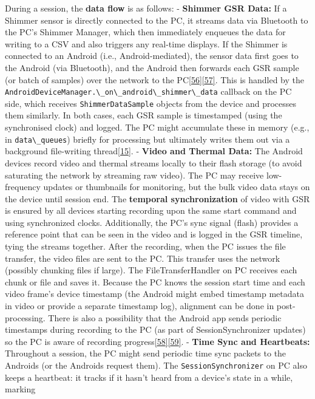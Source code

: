 \documentclass[12pt,a4paper]{article}
\begin{document}
During a session, the \textbf{data flow} is as follows: - \textbf{Shimmer GSR Data:} If a Shimmer sensor is directly connected to the PC, it streams data via Bluetooth to the PC's Shimmer Manager, which then immediately enqueues the data for writing to a CSV and also triggers any real-time displays. If the Shimmer is connected to an Android (i.e., Android-mediated), the sensor data first goes to the Android (via Bluetooth), and the Android then forwards each GSR sample (or batch of samples) over the network to the PC\href{https://github.com/buccancs/bucika_gsr/blob/7048f7f6a7536f5cd577ed2184800d3dad97fd08/PythonApp/shimmer_manager.py\#L260-L269}{{[}56{]}}\href{https://github.com/buccancs/bucika_gsr/blob/7048f7f6a7536f5cd577ed2184800d3dad97fd08/PythonApp/shimmer_manager.py\#L261-L268}{{[}57{]}}. This is handled by the \passthrough{\lstinline!AndroidDeviceManager.\_on\_android\_shimmer\_data!} callback on the PC side, which receives \passthrough{\lstinline!ShimmerDataSample!} objects from the device and processes them similarly. In both cases, each GSR sample is timestamped (using the synchronised clock) and logged. The PC might accumulate these in memory (e.g., in \passthrough{\lstinline!data\_queues!}) briefly for processing but ultimately writes them out via a background file-writing thread\href{https://github.com/buccancs/bucika_gsr/blob/7048f7f6a7536f5cd577ed2184800d3dad97fd08/PythonApp/shimmer_manager.py\#L163-L171}{{[}15{]}}. - \textbf{Video and Thermal Data:} The Android devices record video and thermal streams locally to their flash storage (to avoid saturating the network by streaming raw video). The PC may receive low-frequency updates or thumbnails for monitoring, but the bulk video data stays on the device until session end. The \textbf{temporal synchronization} of video with GSR is ensured by all devices starting recording upon the same start command and using synchronized clocks. Additionally, the PC's sync signal (flash) provides a reference point that can be seen in the video and is logged in the GSR timeline, tying the streams together. After the recording, when the PC issues the file transfer, the video files are sent to the PC. This transfer uses the network (possibly chunking files if large). The FileTransferHandler on PC receives each chunk or file and saves it. Because the PC knows the session start time and each video frame's device timestamp (the Android might embed timestamp metadata in video or provide a separate timestamp log), alignment can be done in post-processing. There is also a possibility that the Android app sends periodic timestamps during recording to the PC (as part of SessionSynchronizer updates) so the PC is aware of recording progress\href{https://github.com/buccancs/bucika_gsr/blob/7048f7f6a7536f5cd577ed2184800d3dad97fd08/PythonApp/session/session_synchronizer.py\#L113-L122}{{[}58{]}}\href{https://github.com/buccancs/bucika_gsr/blob/7048f7f6a7536f5cd577ed2184800d3dad97fd08/PythonApp/session/session_synchronizer.py\#L130-L138}{{[}59{]}}. - \textbf{Time Sync and Heartbeats:} Throughout a session, the PC might send periodic time sync packets to the Androids (or the Androids request them). The \passthrough{\lstinline!SessionSynchronizer!} on PC also keeps a heartbeat: it tracks if it hasn't heard from a device's state in a while, marking 
\end{document}
